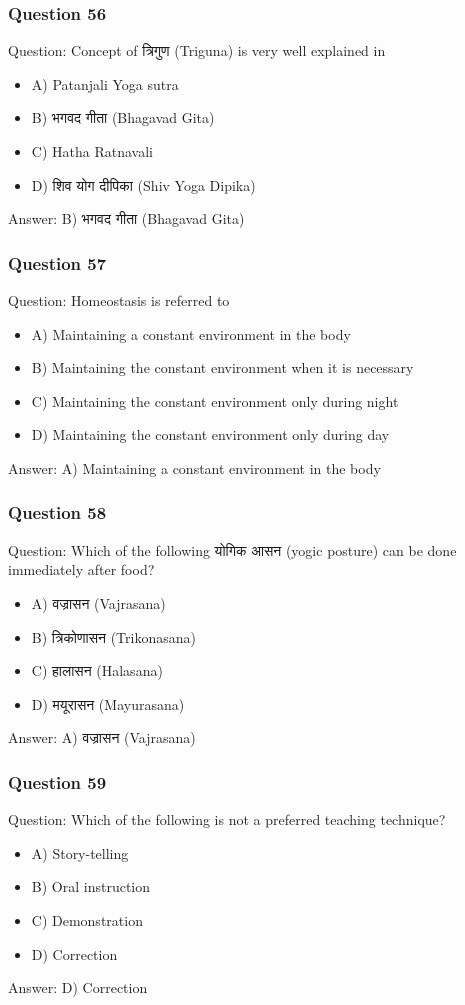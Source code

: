 \begin{frame}[fragile]\frametitle{Question 56}
Question: Concept of त्रिगुण (Triguna) is very well explained in
\begin{itemize}
\item A) Patanjali Yoga sutra
\item B) भगवद गीता (Bhagavad Gita)
\item C) Hatha Ratnavali
\item D) शिव योग दीपिका (Shiv Yoga Dipika)
\end{itemize}
Answer: B) भगवद गीता (Bhagavad Gita)
\end{frame}

\begin{frame}[fragile]\frametitle{Question 57}
Question: Homeostasis is referred to
\begin{itemize}
\item A) Maintaining a constant environment in the body
\item B) Maintaining the constant environment when it is necessary
\item C) Maintaining the constant environment only during night
\item D) Maintaining the constant environment only during day
\end{itemize}
Answer: A) Maintaining a constant environment in the body
\end{frame}

\begin{frame}[fragile]\frametitle{Question 58}
Question: Which of the following योगिक आसन (yogic posture) can be done immediately after food?
\begin{itemize}
\item A) वज्रासन (Vajrasana)
\item B) त्रिकोणासन (Trikonasana)
\item C) हालासन (Halasana)
\item D) मयूरासन (Mayurasana)
\end{itemize}
Answer: A) वज्रासन (Vajrasana)
\end{frame}

\begin{frame}[fragile]\frametitle{Question 59}
Question: Which of the following is not a preferred teaching technique?
\begin{itemize}
\item A) Story-telling
\item B) Oral instruction
\item C) Demonstration
\item D) Correction
\end{itemize}
Answer: D) Correction
\end{frame}

